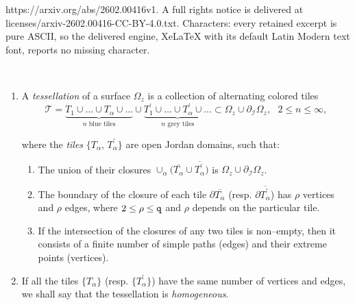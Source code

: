 \documentclass[10pt,a4paper]{amsart}
\begin{document}
https://arxiv.org/abs/2602.00416v1. A full rights notice is delivered at licenses/arxiv-2602.00416-CC-BY-4.0.txt. Characters: every retained excerpt is pure ASCII, so the delivered engine, XeLaTeX with its default Latin Modern text font, reports no missing character.
\begin{definition}
\label{def:de-teselacion}
\
\begin{enumerate}[label=\arabic*),leftmargin=*] 
\item
A  \emph{tessellation} of a
surface $\Omega_z$ is a collection 
of alternating colored tiles
\begin{equation}
\label{teselacion}
\mathscr{T}
=
\underbrace{
T_1 \cup \ldots \cup T_\alpha \cup \ldots  }_{ n\text{ blue tiles} }
\cup 
\underbrace{ T^\prime_1 \cup  
\ldots  \cup T^{\prime}_\alpha  \cup \ldots }_{n \text{ grey tiles}} \subset 
\Omega_z \cup \partial_{\mathcal{I}} \Omega_z, 
\ \ \ 
2 \leq n \leq \infty,
\end{equation}

\noindent
where the \emph{tiles}
$\{ T_{\alpha}, \, T_{\alpha}^\prime \}$
are open Jordan domains, 
such that: 

\begin{enumerate}[label=\roman*),leftmargin=*]
\item
The union of their closures 
$\cup_{{\alpha}}
\big( \overline{T_{\alpha}} 
\cup
\overline{T_{\alpha}^\prime } \big)$
is $\Omega_z \cup \partial_{\mathcal{I}} \Omega_z$.

\item 
The boundary of the closure of each tile 
$\partial\overline{T_\alpha}$ (resp. 
$\partial\overline{ T_{\alpha}^\prime}$) has 
$\rho$ vertices and $\rho$ edges, where $2 \leq \rho \leq {\tt q}$
and $\rho$ depends on the particular tile. 
 


\item
If the intersection of the closures of any
two tiles is non--empty, 
then it consists of a finite number of 
simple paths (edges) and their extreme points (vertices).
\end{enumerate}

\item
If all the tiles $\{ T_{\alpha} \}$
(resp. $\{T_{\alpha}^\prime \}$) have 
the same number of vertices and edges,
we shall say that the tessellation is \emph{homogeneous}.
\end{enumerate}
\end{definition}
\end{document}
